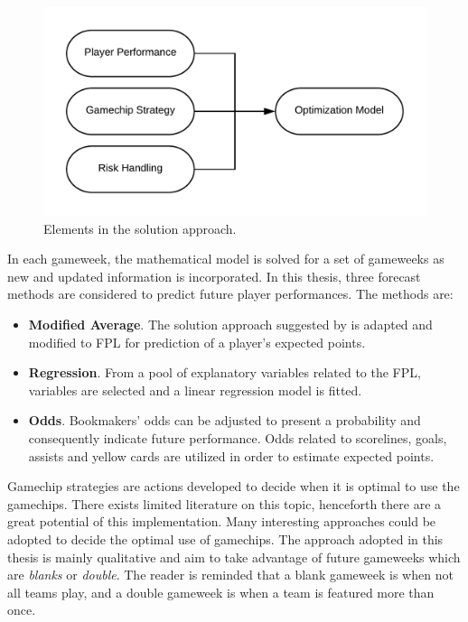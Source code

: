 \begin{figure}[H]
    \centering
    \includegraphics[scale = 0.65]{fig/chapter_5/solution_method.png}
    \caption{Elements in the solution approach.}
    \label{fig:solution_approach}
\end{figure}

\newpar

In each gameweek, the mathematical model is solved for a set of gameweeks as new and updated information is incorporated. In this thesis, three forecast methods are considered to predict future player performances. The methods are: 
\begin{itemize}
    \item \textbf{Modified Average}. The solution approach suggested by \cite{Bonomo} is adapted and modified to FPL for prediction of a player's expected points.
    \item \textbf{Regression}. From a pool of explanatory variables related to the FPL, variables are selected and a linear regression model is fitted. 
    \item \textbf{Odds}. Bookmakers' odds can be adjusted to present a probability and consequently indicate future performance. Odds related to scorelines, goals, assists and yellow cards are utilized in order to estimate expected points. 
\end{itemize}

\newpar

Gamechip strategies are actions developed to decide when it is optimal to use the gamechips.  There exists limited literature on this topic, henceforth there are a great potential of this implementation. Many interesting approaches could be adopted to decide the optimal use of gamechips. The approach adopted in this thesis is mainly qualitative and aim to take advantage of future gameweeks which are \textit{blanks} or \textit{double}. The reader is reminded that a blank gameweek is when not all teams play, and a double gameweek is when a team is featured more than once. 


